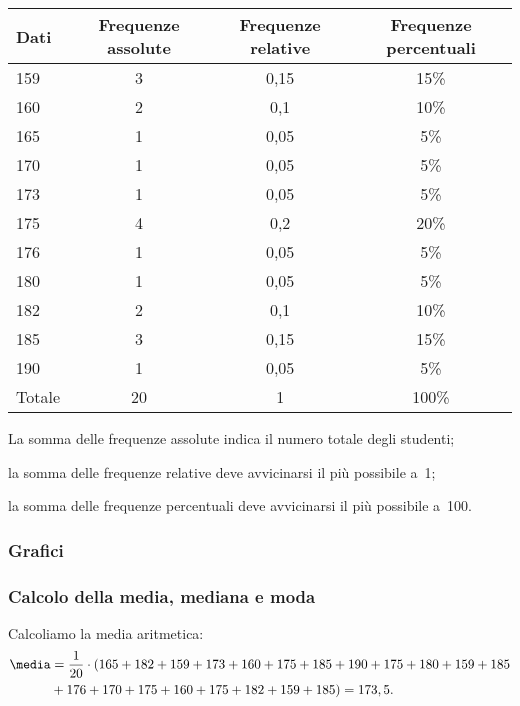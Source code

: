 \begin{exrig}
\begin{esempio}
\begin{center}
\begin{tabular}{lccc}
\toprule
Dati & Frequenze assolute & Frequenze relative & Frequenze percentuali\\
\midrule
159 & 3 & 0,15 & 15\% \\
160 & 2 & 0,1 & 10\% \\
165 & 1 & 0,05 & 5\% \\
170 & 1 & 0,05 & 5\% \\
173 & 1 & 0,05 & 5\% \\
175 & 4 & 0,2 & 20\% \\
176 & 1 & 0,05 & 5\% \\
180 & 1 & 0,05 & 5\% \\
182 & 2 & 0,1 & 10\% \\
185 & 3 & 0,15 & 15\% \\
190 & 1 & 0,05 & 5\% \\
\midrule
Totale & 20 & 1 & 100\% \\
\bottomrule
\end{tabular}
\end{center}
\begin{itemize*}
\item La somma delle frequenze assolute indica il numero totale degli 
studenti;
\item la somma delle frequenze relative deve avvicinarsi il più possibile 
a~1;
\item la somma delle frequenze percentuali deve avvicinarsi il più 
possibile a~100.
\end{itemize*}

\subsubsection{Grafici}
\begin{center}
 
\end{center}

\subsubsection{Calcolo della media, mediana e moda}

Calcoliamo la media aritmetica:
\begin{equation*}
\begin{split}
\media &= \frac{1}{20} \cdot 
(165+182+159+173+160+175+185+190+175+180+159+185\\
 &+176+170+175+160+175+182+159+185)=173,5.
\end{split}
\end{equation*}


\end{esempio}
\end{exrig}
